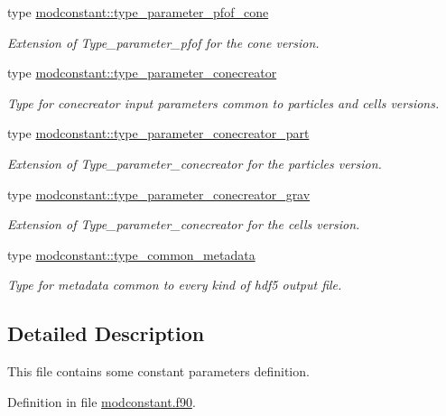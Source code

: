 \begin{DoxyCompactItemize}
type \hyperlink{structmodconstant_1_1type__parameter__pfof__cone}{modconstant\-::type\-\_\-parameter\-\_\-pfof\-\_\-cone}
\begin{DoxyCompactList}\small\item\em Extension of Type\-\_\-parameter\-\_\-pfof for the cone version. \end{DoxyCompactList}\item 
type \hyperlink{structmodconstant_1_1type__parameter__conecreator}{modconstant\-::type\-\_\-parameter\-\_\-conecreator}
\begin{DoxyCompactList}\small\item\em Type for conecreator input parameters common to particles and cells versions. \end{DoxyCompactList}\item 
type \hyperlink{structmodconstant_1_1type__parameter__conecreator__part}{modconstant\-::type\-\_\-parameter\-\_\-conecreator\-\_\-part}
\begin{DoxyCompactList}\small\item\em Extension of Type\-\_\-parameter\-\_\-conecreator for the particles version. \end{DoxyCompactList}\item 
type \hyperlink{structmodconstant_1_1type__parameter__conecreator__grav}{modconstant\-::type\-\_\-parameter\-\_\-conecreator\-\_\-grav}
\begin{DoxyCompactList}\small\item\em Extension of Type\-\_\-parameter\-\_\-conecreator for the cells version. \end{DoxyCompactList}\item 
type \hyperlink{structmodconstant_1_1type__common__metadata}{modconstant\-::type\-\_\-common\-\_\-metadata}
\begin{DoxyCompactList}\small\item\em Type for metadata common to every kind of hdf5 output file. \end{DoxyCompactList}\end{DoxyCompactItemize}


\subsection{Detailed Description}
This file contains some constant parameters definition. 

Definition in file \hyperlink{modconstant_8f90_source}{modconstant.\-f90}.

